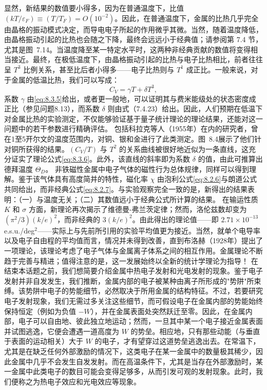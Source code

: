 显然，新结果的数值要小得多，因为在普通温度下，比值 \((kT/\varepsilon_F) \equiv (T/T_F) = O(10^{-2})\)。因此，在普通温度下，金属的比热几乎完全由晶格的振动模式决定，而导电电子所起的作用微乎其微。当然，随着温度降低，由晶格振动引起的比热也会随之下降，最终会远远小于经典值；请参阅第 7.4 节，尤其是图~7.14。当温度降至某一特定水平时，这两种非经典贡献的数值将变得相当接近。最终，在极低温度下，由晶格振动引起的比热与电子比热相比，前者往往呈 \(T^3\) 比例关系，甚至比后者小得多——电子比热则与 \(T^1\) 成正比。一般来说，对于金属的低温比热，我们可以写成：
\begin{equation}\tag{8.3.6}\label{eq:8.3.6}
C _ { V } = \gamma T + \delta T ^{3} ,
\end{equation}
系数 \(\gamma\) 由\autoref{eq:8.3.5}给出，或者更一般地，可以证明其与费米能级处的状态密度成正比（参见问题8.13），而系数 \(\delta\) 则由式（7.4.23）给出。因此，人们预期在低温下对金属比热的实验测定，不仅能够验证基于量子统计理论的理论结果，还能对这一问题中的若干参数进行精确评估。
包括科拉克等人（1955年）在内的研究者，曾在1至5开尔文的温度范围内，对铜、银和金进行了此类测定。图~8.4展示了他们针对铜所获得的结果。\((C_V/T)\) 与 \(T^2\) 的关系曲线被很好地近似为一条直线，这充分证实了理论公式\autoref{eq:8.3.6}。此外，该直线的斜率即为系数 \(\delta\) 的值，由此可推算出德拜温度 \(\Theta_D\)。
非铁磁性金属中电子气体的磁性行为总体规律，同样可以得到理解。鉴于该气体具有高度简并的特性，磁化率 \(\chi\) 由泡利公式\autoref{eq:8.2.6}与朗道公式共同给出，而非经典公式\autoref{eq:8.2.7}。与实验观察完全一致的是，新得出的结果表明：（一）与温度无关；（二）其数值远小于经典公式所计算的结果。
在输运性质 \(K\) 和 \(\sigma\) 方面，新理论再次揭示了维德曼-弗兰茨定律；然而，洛伦兹数却变为 \((\pi^2/3)(k/e)^2\)，而非经典的 \(3(k/e)^2\)。由此得出的理论值——即 \(2.71 \times 10^{-13}\) e.s.u./deg\(^2\)——实际上与先前所引用的实验平均值更为接近。当然，就单个电导率以及电子自由程的平均值而言，情况并未得到改善，直到布洛赫（1928年）提出了一项理论，该理论考虑了电子气体与金属离子体系之间的相互作用。金属理论不断趋于完善与精进；值得注意的是，这一发展始终以全新的统计学理论为指导！
在结束本话题之前，我们想简要介绍金属中热电子发射和光电发射的现象。鉴于电子发射并非自发发生，我们推断，金属内部的电子被某种由离子所形成的"势阱"所束缚。该势阱中电子的势能细节，必然取决于所用金属的结构特征。不过，若要研究电子发射现象，我们无需过多关注这些细节，而可假设电子在金属内部的势能始终保持恒定（例如为负值 \(-W\)），并在金属表面处突然跃迁至零。因此，在金属内部，电子可以自由地、彼此独立地运动；然而，一旦其中某一个电子接近金属表面并试图逃逸，它便会遭遇一道高度为 \(W\) 的势垒。相应地，只有那些动能（与垂直于表面的运动相关）大于 \(W\) 的电子，才有望穿过这道势垒逃逸出去。在常温下，尤其是在缺乏任何外部激励的情况下，这类电子在某一金属中的数量极其稀少，因此金属中几乎不会发生自发发射。而在高温条件下，尤其是当存在外部激励时，某一金属中此类电子的数目可能会变得足够多，从而引发可观的发射现象。此时，我们便称之为热电子效应和光电效应等现象。
